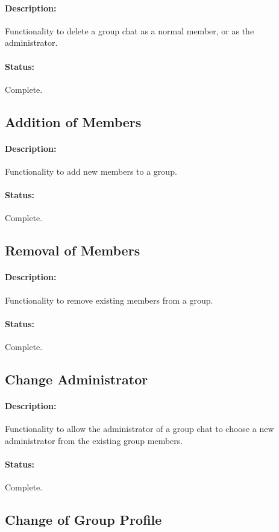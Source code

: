 \documentclass[11pt]{article}
\begin{document}
\paragraph{Description:} Functionality to delete a group chat as a normal member, or as the administrator.
\paragraph{Status:} Complete.

\subsection{Addition of Members}
\paragraph{Description:} Functionality to add new members to a group.
\paragraph{Status:} Complete.

\subsection{Removal of Members}
\paragraph{Description:} Functionality to remove existing members from a group.
\paragraph{Status:} Complete.

\subsection{Change Administrator}
\paragraph{Description:} Functionality to allow the administrator of a group chat to choose a new administrator from the existing group members.
\paragraph{Status:} Complete.

\subsection{Change of Group Profile}
\end{document}
